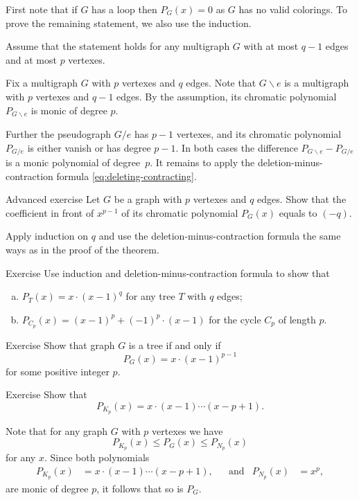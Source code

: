 First note that if $G$ has a loop then $P_G(x)=0$ as $G$ has no valid colorings.
To prove the remaining statement, we also use the induction.

Assume that the statement holds for any multigraph $G$ with at most $q-1$ edges and at most $p$ vertexes.

Fix a multigraph $G$ with $p$ vertexes and $q$ edges.
Note that $G\backslash e$ is a multigraph with $p$ vertexes and $q-1$ edges.
By the assumption, its chromatic polynomial $P_{G\backslash e}$ is monic of degree $p$.

Further the pseudograph $G/e$ has $p-1$ vertexes,
and its chromatic polynomial $P_{G/e}$ is either vanish or has degree $p-1$.
In both cases the difference $P_{G\backslash e}-P_{G/e}$ is a monic polynomial of degree~$p$.
It remains to apply the deletion-minus-contraction formula \ref{eq:deleting-contracting}.
\qedsf

\begin{thm}{Advanced exercise}
Let $G$ be a graph with $p$ vertexes and $q$ edges.
Show that the coefficient in front of $x^{p-1}$ of its chromatic polynomial $P_G(x)$ equals to $(-q)$.
\end{thm}

 Apply induction on $q$ and use the deletion-minus-contraction formula the same ways as in the proof of the theorem.

\begin{thm}{Exercise}
Use induction and  deletion-minus-contraction formula to show that 
\begin{enumerate}[(a)]
\item $P_{T}(x)=x\cdot(x-1)^q$ for any tree $T$ with $q$ edges;
\item $P_{C_p}(x)=(x-1)^p+(-1)^p\cdot(x-1)$ for the cycle $C_p$ of length $p$.
\end{enumerate}
\end{thm}


\begin{thm}{Exercise} Show that graph $G$ is a tree if and only if \[P_G(x)= x\cdot(x-1)^{p-1}\] for some positive integer $p$.
\end{thm}

\begin{thm}{Exercise}\label{ex:chrom(K_p)}
Show that 
\[P_{K_p}(x)=x\cdot(x-1)\cdots(x-p+1).\]

\end{thm}

Note that for any graph $G$ with $p$ vertexes we have
\[P_{K_p}(x)\le P_G(x)\le P_{N_p}(x)\]
for any $x$.
Since both polynomials
\begin{align*}
P_{K_p}(x)&=x\cdot(x-1)\cdots(x-p+1),&&
\text{and}
&
P_{N_p}(x)&=x^p,
\end{align*}
are monic of degree $p$,
it follows that so is $P_G$.

